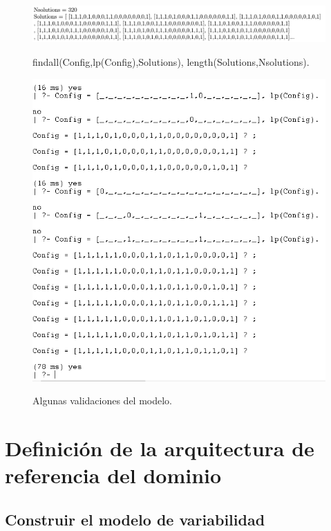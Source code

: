 \documentclass[10pt,a4paper,openany]{book}
\begin{document}
\begin{figure}[h]
	\centering
	\caption{findall(Config,lp(Config),Solutions), length(Solutions,Nsolutions).}
	\includegraphics[width=1\textwidth]{gnu1}
	\label{fig:gnu1}
\end{figure}

\begin{figure}[h]
	\centering
	\caption{Algunas validaciones del modelo.}
	\includegraphics[width=1\textwidth]{gnu2}
	\label{fig:gnu2}
\end{figure}



\chapter{Definición de la arquitectura de referencia del dominio}

\section{Construir el modelo de variabilidad}
\end{document}
